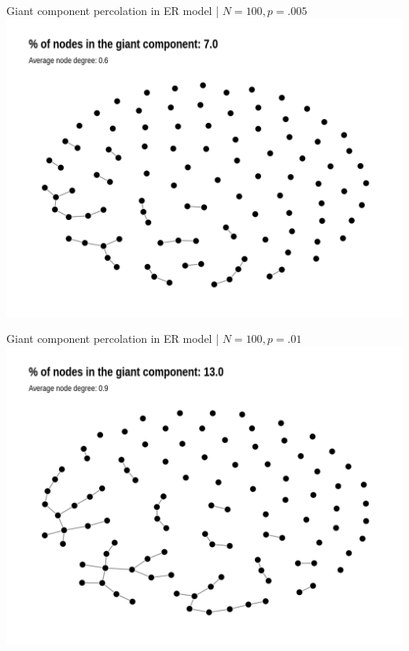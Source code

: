 \documentclass[
    hyperref={colorlinks,linkcolor=blue,urlcolor=blue,citecolor=blue}
]{beamer}
\begin{document}
\begin{frame}{Giant component percolation in ER model | $N = 100, p = .005$}
\centering
\includegraphics[width=.9\textwidth]{overview/er_model_percolation-1.png}
\end{frame}

\begin{frame}{Giant component percolation in ER model | $N = 100, p = .01$}
\centering
\includegraphics[width=.9\textwidth]{overview/er_model_percolation-2.png}
\end{frame}
\end{document}
